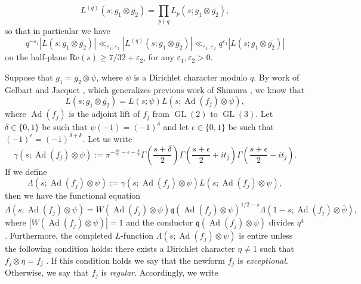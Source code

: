 \documentclass{article}
\theoremstyle{named}
\newcommand{\q}{\mathfrak{q}}
\DeclareMathOperator{\GL}{GL}
\DeclareMathOperator{\Ad}{Ad}
\begin{document}
\begin{equation*}
    L^{(q)}(s; g_1 \otimes \overline{g_2}) = \prod_{p \nmid q} L_p(s; g_1 \otimes \overline{g_2}),
\end{equation*}
so that in particular we have
\begin{equation}\label{eq:rankinselbergisalmosteulerproduct}
    q^{-\varepsilon_1}|L(s; g_1 \otimes \overline{g_2})| \ll_{\varepsilon_1, \varepsilon_2} |L^{(q)}(s; g_1 \otimes \overline{g_2})| \ll_{\varepsilon_1, \varepsilon_2} q^{\varepsilon_1} |L(s; g_1 \otimes \overline{g_2})|
\end{equation}
on the half-plane $\text{Re}(s) \geq 7/32 + \varepsilon_2$, for any $\varepsilon_1, \varepsilon_2 > 0$.

Suppose that $g_1 = g_2 \otimes \psi$, where $\psi$ is a Dirichlet character modulo $q$. By work of Gelbart and Jacquet \cite{gelbartjacquetlift}, which generalizes previous work of Shimura \cite{shimuraholomorphy}, we know that 
\begin{equation}\label{eq:gelbartjacquetlift}
    L(s; g_1 \otimes \overline{g_2}) = L(s; \psi)L(s; \Ad(f_j)\otimes \psi),
\end{equation}
where $\Ad(f_j)$ is the adjoint lift of $f_j$ from $\GL(2)$ to $\GL(3)$.
Let $\delta \in \{0, 1\}$ be such that $\psi(-1) = (-1)^\delta$ and let $\epsilon \in \{0, 1\}$ be such that $(-1)^\epsilon = (-1)^{\delta + k}$. Let us write
\begin{equation}\label{eq:gammafactorinfinity}
    \gamma(s; \Ad(f_j)\otimes \psi):= \pi^{-\frac{3s}{2} - \epsilon - \frac{\delta}{2}} \Gamma\left(\frac{s + \delta}{2}\right)\Gamma\left(\frac{s + \epsilon}{2} + it_j\right)\Gamma\left(\frac{s + \epsilon}{2} - it_j\right).
\end{equation}
If we define 
\begin{equation}\label{eq:completedadjointlfunction}
    \Lambda(s; \Ad(f_j)\otimes \psi) := \gamma(s; \Ad(f_j)\otimes \psi)L(s; \Ad(f_j)\otimes \psi),
\end{equation}
then we have the functional equation
\begin{equation}\label{eq:functionalequationadjoint}
    \Lambda(s; \Ad(f_j)\otimes \psi) = W(\Ad(f_j)\otimes \psi)\q(\Ad(f_j)\otimes \psi)^{1/2 - s} \Lambda(1-s; \Ad(f_j)\otimes \overline{\psi}),
\end{equation}
where $|W(\Ad(f_j)\otimes \psi)| = 1$ and the conductor $\q(\Ad(f_j)\otimes \psi)$ divides $q^4$. Furthermore, the completed $L$-function $\Lambda(s; \Ad(f_j)\otimes \psi)$ is entire unless the following condition holds: there exists a Dirichlet character $\eta \neq 1$ such that $f_j \otimes \eta = f_j$ \cite[Theorem 9.3]{gelbartjacquetlift}. If this condition holds we say that the newform $f_j$ is \emph{exceptional}. Otherwise, we say that $f_j$ is \emph{regular}. Accordingly, we write 
\end{document}
